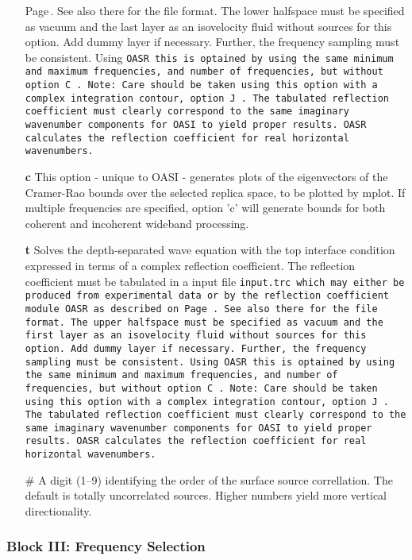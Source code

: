 \begin{itemize}
Page\,\pageref{trc-form}. See also there for the file format.
The lower halfspace must be specified as vacuum and the last layer as
an isovelocity fluid without sources for this option. Add dummy layer
if necessary. Further, the
frequency sampling must be consistent. 
Using \tt OASR \rm this is optained by using
the same minimum and maximum frequencies, and number of frequencies, but without option \tt C \rm.
Note: Care should be taken using this option with a complex
integration contour, option \tt J \rm. The tabulated reflection
coefficient must clearly correspond to the same imaginary wavenumber
components for \tt OASI \rm to yield proper results. \tt OASR \rm calculates
the reflection coefficient for real horizontal wavenumbers.
\item[{\bf c}] This option - unique to OASI - generates plots of the
    eigenvectors of the Cramer-Rao bounds over the selected replica
    space, to be plotted by mplot. If multiple frequencies are
    specified, option 'c' will generate bounds for both coherent and
    incoherent wideband processing.
    \item[{\bf t}] Solves the depth-separated wave equation with the
top  interface condition expressed in terms of a complex
reflection coefficient. The reflection coefficient must be tabulated in a input file \tt input.trc \rm
which may either be produced from experimental data or by the
reflection coefficient module \tt OASR \rm as described on
Page\,\pageref{trc-form}. See also there for the file format.
The upper halfspace must be specified as vacuum and the first layer as
an isovelocity fluid without sources for this option. Add dummy layer
if necessary. Further, the
frequency sampling must be consistent. 
Using \tt OASR \rm this is optained by using the same minimum and 
maximum frequencies, and number of frequencies, but without option \tt C \rm.
Note: Care should be taken using this option with a complex
integration contour, option \tt J \rm. The tabulated reflection
coefficient must clearly correspond to the same imaginary wavenumber
components for \tt OASI \rm to yield proper results. \tt OASR \rm calculates
the reflection coefficient for real horizontal wavenumbers.
\item[\#] A digit (1--9) identifying the order of the surface source
correllation. The default is totally uncorrelated sources.
Higher numbers yield more vertical directionality.
\end{itemize}

\subsubsection{Block III: Frequency Selection}

